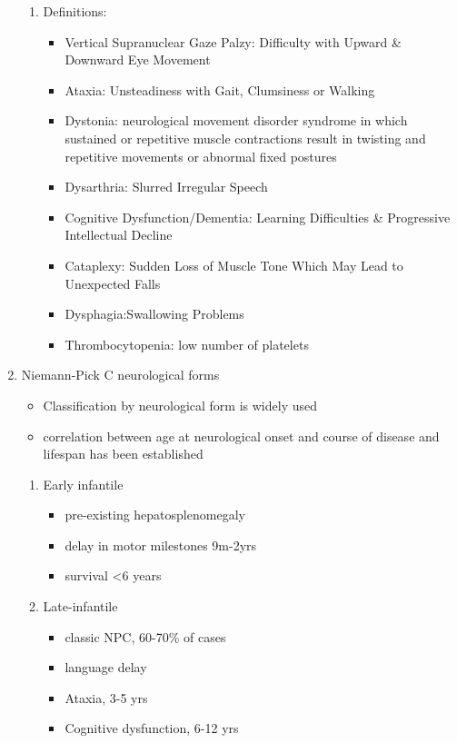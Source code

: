 \documentclass{scrartcl}
\begin{document}
\begin{enumerate}
\begin{enumerate}
\item Definitions:
\label{sec:org54efc70}
\begin{itemize}
\item Vertical Supranuclear Gaze Palzy: Difficulty with Upward \& Downward Eye Movement
\item Ataxia: Unsteadiness with Gait, Clumsiness or Walking
\item Dystonia:  neurological movement disorder syndrome in which sustained or repetitive muscle contractions result in twisting and repetitive movements or abnormal fixed postures
\item Dysarthria: Slurred Irregular Speech
\item Cognitive Dysfunction/Dementia: Learning Difficulties \& Progressive Intellectual Decline
\item Cataplexy: Sudden Loss of Muscle Tone Which May Lead to Unexpected Falls
\item Dysphagia:Swallowing Problems
\item Thrombocytopenia: low number of platelets
\end{itemize}
\end{enumerate}

\item Niemann-Pick C neurological forms
\label{sec:org2b6bf54}

\small
\begin{itemize}
\item Classification by neurological form is widely used
\item correlation between age at neurological onset and course of disease
and lifespan has been established
\end{itemize}

\begin{enumerate}
\item Early infantile
\label{sec:orgca155b4}
\begin{itemize}
\item pre-existing hepatosplenomegaly
\item delay in motor milestones 9m-2yrs
\item survival <6 years
\end{itemize}

\item Late-infantile
\label{sec:org866ff09}
\begin{itemize}
\item classic NPC, 60-70\% of cases
\item language delay
\item Ataxia, 3-5 yrs
\item Cognitive dysfunction, 6-12 yrs
\end{itemize}


\end{enumerate}
\end{enumerate}
\end{document}
